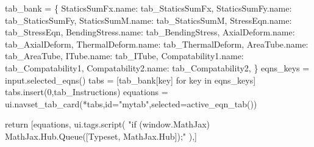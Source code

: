 \documentclass[
  letterpaper,
  DIV=11,
  numbers=noendperiod]{scrreprt}
\newenvironment{Shaded}{\begin{snugshade}}{\end{snugshade}}
\newcommand{\NormalTok}[1]{\textcolor[rgb]{0.00,0.23,0.31}{#1}}
\begin{document}
\begin{Shaded}
\begin{Highlighting}[]
\NormalTok{        tab\_bank = \{}
\NormalTok{                StaticsSumFx.name: tab\_StaticsSumFx,}
\NormalTok{                StaticsSumFy.name: tab\_StaticsSumFy,}
\NormalTok{                StaticsSumM.name: tab\_StaticsSumM,}
\NormalTok{                StressEqn.name: tab\_StressEqn,}
\NormalTok{                BendingStress.name: tab\_BendingStress,}
\NormalTok{                AxialDeform.name: tab\_AxialDeform,}
\NormalTok{                ThermalDeform.name: tab\_ThermalDeform,}
\NormalTok{                AreaTube.name: tab\_AreaTube,}
\NormalTok{                ITube.name: tab\_ITube,}
\NormalTok{                Compatability1.name: tab\_Compatability1,}
\NormalTok{                Compatability2.name: tab\_Compatability2,}
\NormalTok{                \}}
\NormalTok{        eqns\_keys = input.selected\_eqns()}
\NormalTok{        tabs = [tab\_bank[key] for key in eqns\_keys]}
\NormalTok{        tabs.insert(0,tab\_Instructions)}
\NormalTok{        equations = ui.navset\_tab\_card(*tabs,id="mytab",selected=active\_eqn\_tab())                    }
    
\NormalTok{        return [equations,}
\NormalTok{               ui.tags.script(}
\NormalTok{                "if (window.MathJax) MathJax.Hub.Queue([\textquotesingle{}Typeset\textquotesingle{}, MathJax.Hub]);"}
\NormalTok{        ),]}


\end{Highlighting}
\end{Shaded}
\end{document}
